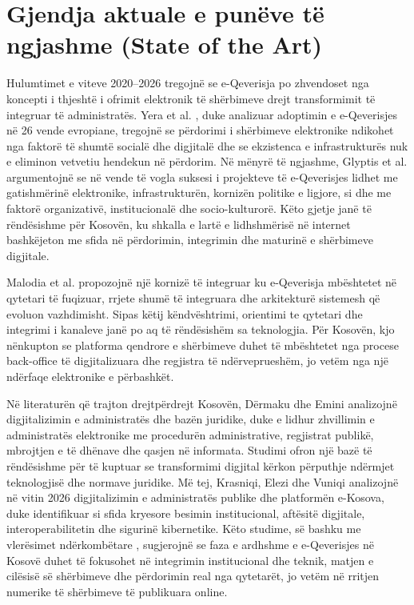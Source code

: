 \documentclass[conference]{IEEEtran}
\begin{document}
\section{Gjendja aktuale e punëve të ngjashme (State of the Art)}
Hulumtimet e viteve 2020–2026 tregojnë se e-Qeverisja po zhvendoset nga koncepti i thjeshtë i ofrimit elektronik të shërbimeve drejt transformimit të integruar të administratës. Yera et al. \cite{r1}, duke analizuar adoptimin e e-Qeverisjes në 26 vende evropiane, tregojnë se përdorimi i shërbimeve elektronike ndikohet nga faktorë të shumtë socialë dhe digjitalë dhe se ekzistenca e infrastrukturës nuk e eliminon vetvetiu hendekun në përdorim. Në mënyrë të ngjashme, Glyptis et al. \cite{r2} argumentojnë se në vende të vogla suksesi i projekteve të e-Qeverisjes lidhet me gatishmërinë elektronike, infrastrukturën, kornizën politike e ligjore, si dhe me faktorë organizativë, institucionalë dhe socio-kulturorë. Këto gjetje janë të rëndësishme për Kosovën, ku shkalla e lartë e lidhshmërisë në internet bashkëjeton me sfida në përdorimin, integrimin dhe maturinë e shërbimeve digjitale.

Malodia et al. \cite{r3} propozojnë një kornizë të integruar ku e-Qeverisja mbështetet në qytetari të fuqizuar, rrjete shumë të integruara dhe arkitekturë sistemesh që evoluon vazhdimisht. Sipas këtij këndvështrimi, orientimi te qytetari dhe integrimi i kanaleve janë po aq të rëndësishëm sa teknologjia. Për Kosovën, kjo nënkupton se platforma qendrore e shërbimeve duhet të mbështetet nga procese back-office të digjitalizuara dhe regjistra të ndërveprueshëm, jo vetëm nga një ndërfaqe elektronike e përbashkët.

Në literaturën që trajton drejtpërdrejt Kosovën, Dërmaku dhe Emini \cite{r8} analizojnë digjitalizimin e administratës dhe bazën juridike, duke e lidhur zhvillimin e administratës elektronike me procedurën administrative, regjistrat publikë, mbrojtjen e të dhënave dhe qasjen në informata. Studimi ofron një bazë të rëndësishme për të kuptuar se transformimi digjital kërkon përputhje ndërmjet teknologjisë dhe normave juridike. Më tej, Krasniqi, Elezi dhe Vuniqi \cite{r9} analizojnë në vitin 2026 digjitalizimin e administratës publike dhe platformën e-Kosova, duke identifikuar si sfida kryesore besimin institucional, aftësitë digjitale, interoperabilitetin dhe sigurinë kibernetike. Këto studime, së bashku me vlerësimet ndërkombëtare \cite{r6,r7}, sugjerojnë se faza e ardhshme e e-Qeverisjes në Kosovë duhet të fokusohet në integrimin institucional dhe teknik, matjen e cilësisë së shërbimeve dhe përdorimin real nga qytetarët, jo vetëm në rritjen numerike të shërbimeve të publikuara online.
\end{document}
